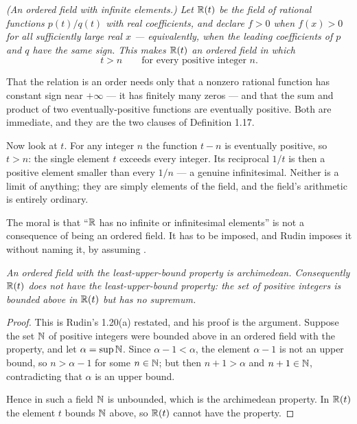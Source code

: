 \emph{(An ordered field with infinite elements.) Let $\mathbb{R}(t)$ be the field of
rational functions $p(t)/q(t)$ with real coefficients, and declare
$f > 0$ when $f(x) > 0$ for all sufficiently large real $x$ --- equivalently,
when the leading coefficients of $p$ and $q$ have the same sign. This makes
$\mathbb{R}(t)$ an ordered field in which}
\[ t > n \qquad \text{for every positive integer } n . \]

\begin{unpack}
That the relation is an order needs only that a nonzero rational function has
constant sign near $+\infty$ --- it has finitely many zeros --- and that the
sum and product of two eventually-positive functions are eventually positive.
Both are immediate, and they are the two clauses of Definition 1.17.

Now look at $t$. For any integer $n$ the function $t - n$ is eventually
positive, so $t > n$: the single element $t$ exceeds every integer. Its
reciprocal $1/t$ is then a positive element smaller than every $1/n$ --- a
genuine infinitesimal. Neither is a limit of anything; they are simply
elements of the field, and the field's arithmetic is entirely ordinary.

The moral is that ``$\mathbb{R}$ has no infinite or infinitesimal elements'' is not a
consequence of being an ordered field. It has to be imposed, and Rudin
imposes it without naming it, by assuming \lub{}.
\end{unpack}

\emph{An ordered field with the least-upper-bound property is archimedean.
Consequently $\mathbb{R}(t)$ does not have the least-upper-bound property: the set of
positive integers is bounded above in $\mathbb{R}(t)$ but has no supremum.}

\begin{proof}
This is Rudin's 1.20(a) restated, and his proof is the argument. Suppose the
set $\mathbb{N}$ of positive integers were bounded above in an ordered field with the
\lub{} property, and let $\alpha = \sup \mathbb{N}$. Since $\alpha - 1 < \alpha$, the
element $\alpha-1$ is not an upper bound, so $n > \alpha-1$ for some
$n \in \mathbb{N}$; but then $n+1 > \alpha$ and $n+1 \in \mathbb{N}$, contradicting that
$\alpha$ is an upper bound.

Hence in such a field $\mathbb{N}$ is unbounded, which is the archimedean property.
In $\mathbb{R}(t)$ the element $t$ bounds $\mathbb{N}$ above, so $\mathbb{R}(t)$ cannot have the
\lub{} property.
\end{proof}

